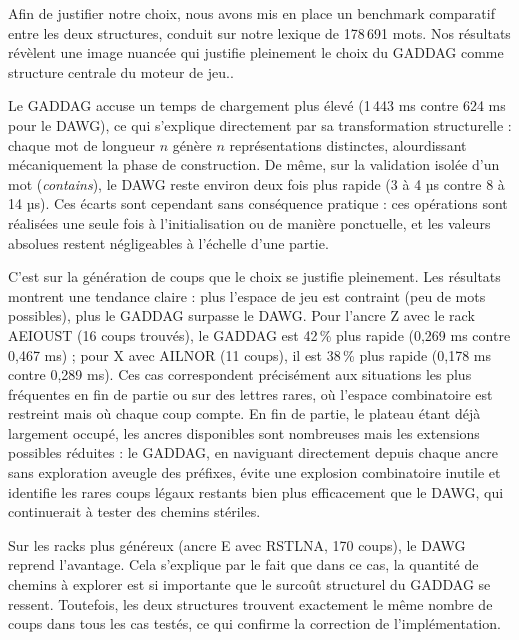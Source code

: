 \documentclass[a4paper]{article}
\begin{document}
Afin de justifier notre choix, nous avons mis en place un benchmark comparatif entre les deux structures, conduit sur notre lexique de 178\,691 mots. Nos résultats révèlent une image nuancée qui justifie pleinement le choix du GADDAG comme structure centrale du moteur de jeu..\newline


Le GADDAG accuse un temps de chargement plus élevé (1\,443 ms contre 624 ms pour le DAWG), ce qui s'explique directement par sa transformation structurelle : chaque mot de 
longueur $n$ génère $n$ représentations distinctes, alourdissant mécaniquement la phase de construction. De même, sur la validation isolée d'un mot (\textit{contains}), 
le DAWG reste environ deux fois plus rapide (3 à 4 µs contre 8 à 14 µs). Ces écarts sont cependant sans conséquence pratique : ces opérations sont réalisées une seule fois 
à l'initialisation ou de manière ponctuelle, et les valeurs absolues restent négligeables à l'échelle d'une partie.\newline

C'est sur la génération de coups que le choix se justifie pleinement. Les résultats montrent une tendance claire : plus l'espace de jeu est contraint (peu de mots possibles), 
plus le GADDAG surpasse le DAWG. Pour l'ancre Z avec le rack AEIOUST (16 coups trouvés), le GADDAG est 42\,\% plus rapide (0,269 ms contre 0,467 ms) ; pour 
X avec AILNOR (11 coups), il est 38\,\% plus rapide (0,178 ms contre 0,289 ms). Ces cas correspondent précisément aux situations les plus fréquentes en fin 
de partie ou sur des lettres rares, où l'espace combinatoire est restreint mais où chaque coup compte. En fin de partie, le plateau étant déjà largement occupé, les ancres 
disponibles sont nombreuses mais les extensions possibles réduites : le GADDAG, en naviguant directement depuis chaque ancre sans exploration aveugle des préfixes, évite une 
explosion combinatoire inutile et identifie les rares coups légaux restants bien plus efficacement que le DAWG, qui continuerait à tester des chemins stériles.\newline

Sur les racks plus généreux (ancre E avec RSTLNA, 170 coups), le DAWG reprend l'avantage. Cela s'explique par le fait que dans ce cas, la quantité de chemins à 
explorer est si importante que le surcoût structurel du GADDAG se ressent. Toutefois, les deux structures trouvent exactement le même nombre de coups dans tous 
les cas testés, ce qui confirme la correction de l'implémentation.\newline
\end{document}
